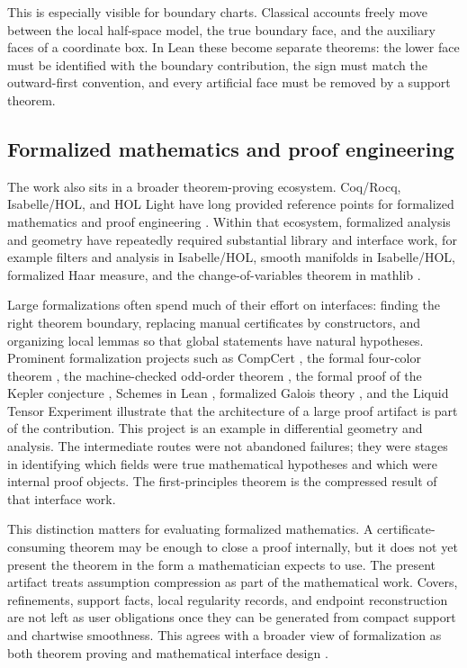 This is especially visible for boundary charts.  Classical accounts freely
move between the local half-space model, the true boundary face, and the
auxiliary faces of a coordinate box.  In Lean these become separate theorems:
the lower face must be identified with the boundary contribution, the sign
must match the outward-first convention, and every artificial face must be
removed by a support theorem.

\subsection{Formalized mathematics and proof engineering}

The work also sits in a broader theorem-proving ecosystem.  Coq/Rocq,
Isabelle/HOL, and HOL Light have long provided reference points for formalized
mathematics and proof engineering
\cite{bertot2004coqart,nipkow2002isabelle,harrison2009handbook,wiedijk2006seventeen,harrison2014history}.
Within that ecosystem, formalized analysis and geometry have repeatedly
required substantial library and interface work, for example filters and
analysis in Isabelle/HOL, smooth manifolds in Isabelle/HOL, formalized Haar
measure, and the change-of-variables theorem in mathlib
\cite{holzl2013filters,immler2019smooth,vandoorn2021haar,gouezel2022change}.

Large formalizations often spend much of their effort on interfaces: finding
the right theorem boundary, replacing manual certificates by constructors, and
organizing local lemmas so that global statements have natural hypotheses.
Prominent formalization projects such as CompCert
\cite{leroy2009formal}, the formal four-color theorem
\cite{gonthier2008fourcolor}, the machine-checked odd-order theorem
\cite{gonthier2013machine}, the formal proof of the Kepler conjecture
\cite{hales2017kepler}, Schemes in Lean \cite{buzzard2022schemes},
formalized Galois theory \cite{browning2022galois}, and the Liquid Tensor
Experiment \cite{scholze2022liquid} illustrate that the
architecture of a large proof artifact is part of the contribution.  This
project is an example in differential geometry and analysis.  The intermediate
routes were not abandoned failures; they were stages in identifying which
fields were true mathematical hypotheses and which were internal proof
objects.  The first-principles theorem is the compressed result of that
interface work.

This distinction matters for evaluating formalized mathematics.  A
certificate-consuming theorem may be enough to close a proof internally, but it
does not yet present the theorem in the form a mathematician expects to use.
The present artifact treats assumption compression as part of the mathematical
work.  Covers, refinements, support facts, local regularity records, and
endpoint reconstruction are not left as user obligations once they can be
generated from compact support and chartwise smoothness.  This agrees with a
broader view of formalization as both theorem proving and mathematical
interface design \cite{avigad2018mechanization,baanen2022instance}.

